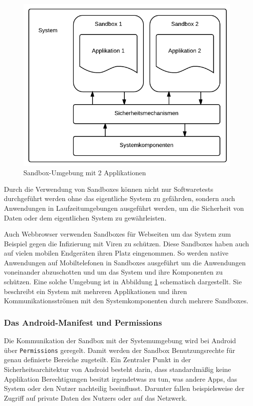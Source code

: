 \begin{figure}[ht!]
\begin{center}
\includegraphics[scale=0.4]{images/sandbox}
\caption{Sandbox-Umgebung mit 2 Applikationen}
\label{sandbox_pic}
\end{center}
\end{figure}

Durch die Verwendung von Sandboxes können nicht nur Softwaretests durchgeführt werden ohne das eigentliche System zu gefährden, sondern auch Anwendungen in Laufzeitumgebungen ausgeführt werden, um die Sicherheit von Daten oder dem eigentlichen System zu gewährleisten. 

Auch Webbrowser verwenden Sandboxes für Webseiten um das System zum Beispiel gegen die Infizierung mit Viren zu schützen. Diese Sandboxes haben auch auf vielen mobilen Endgeräten ihren Platz eingenommen. So werden native Anwendungen auf Mobiltelefonen in Sandboxes ausgeführt um die Anwendungen voneinander abzuschotten und um das System und ihre Komponenten zu schützen. Eine solche Umgebung ist in Abbildung \ref{sandbox_pic} schematisch dargestellt. Sie beschreibt ein System mit mehreren Applikationen und ihren Kommunikationsströmen mit den Systemkomponenten durch mehrere Sandboxes.

\subsubsection{Das Android-Manifest und Permissions}

Die Kommunikation der Sandbox mit der Systemumgebung wird bei Android über \verb+Permissions+ geregelt. Damit werden der Sandbox Benutzungsrechte für genau definierte Bereiche zugeteilt. 
Ein Zentraler Punkt in der Sicherheitsarchitektur von Android besteht darin, dass standardmäßig keine Applikation Berechtigungen besitzt irgendetwas zu tun, was andere Apps, das System oder den Nutzer nachteilig beeinflusst. Darunter fallen beispielsweise der Zugriff auf private Daten des Nutzers oder auf das Netzwerk.

